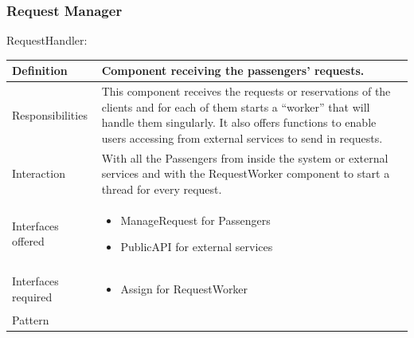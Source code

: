 \documentclass[a4paper,11pt]{report} %
\begin{document}
	\subsubsection{Request Manager}
	\begin{minipage}{\linewidth}
	\end{minipage} \linebreak
	\centerline{RequestHandler:}
	\begin{center}
		\begin{tabular}{| l | p{9cm} |}\hline
			Definition & Component receiving the passengers' requests.\\\hline
			Responsibilities & This component receives the requests or reservations of the clients and for each of them starts a ``worker'' that will handle them singularly. It also offers functions to enable users accessing from external services to send in requests.\\\hline
			Interaction & With all the Passengers from inside the system or external services and with the RequestWorker component to start a thread for every request.\\\hline
			Interfaces offered & \begin{itemize}
				\item ManageRequest for Passengers
				\item PublicAPI for external services
			\end{itemize}\\\hline
			Interfaces required & \begin{itemize}
				\item Assign for RequestWorker
			\end{itemize}\\\hline
			Pattern & \\\hline
		\end{tabular}
	\end{center}
	
\end{document}
